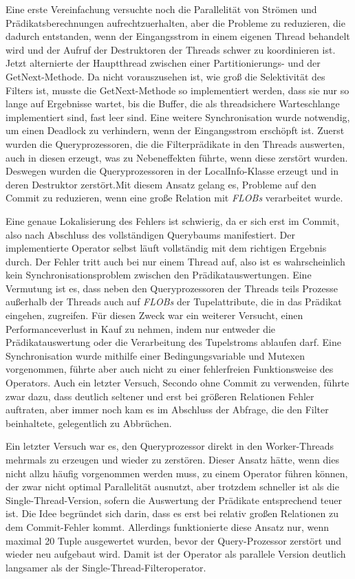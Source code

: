 \documentclass[a4paper,12pt,twoside]{article}
\newcommand{\Fb}[1]{\textit{#1}} %
\begin{document}
Eine erste Vereinfachung versuchte noch die Parallelität von Strömen und Prädikatsberechnungen aufrechtzuerhalten, aber die Probleme zu reduzieren, die dadurch entstanden, wenn der Eingangsstrom in einem eigenen Thread behandelt wird und der Aufruf der Destruktoren der Threads schwer zu koordinieren ist. Jetzt alternierte der Hauptthread zwischen einer Partitionierungs- und der GetNext-Methode. Da nicht vorauszusehen ist, wie groß die Selektivität des Filters ist, musste die GetNext-Methode so implementiert werden, dass sie nur so lange auf Ergebnisse wartet, bis die Buffer, die als threadsichere Warteschlange implementiert sind, fast leer sind. Eine weitere Synchronisation wurde notwendig, um einen Deadlock zu verhindern, wenn der Eingangsstrom erschöpft ist. Zuerst wurden die Queryprozessoren, die die Filterprädikate in den Threads auswerten, auch in diesen erzeugt, was zu Nebeneffekten führte, wenn diese zerstört wurden. Deswegen wurden die Queryprozessoren in der LocalInfo-Klasse erzeugt und in deren Destruktor zerstört.Mit diesem Ansatz gelang es, Probleme auf den Commit zu reduzieren, wenn eine große Relation mit \Fb{FLOBs} verarbeitet wurde.

Eine genaue Lokalisierung des Fehlers ist schwierig, da er sich erst im Commit, also nach Abschluss des vollständigen Querybaums manifestiert. Der implementierte Operator selbst läuft vollständig mit dem richtigen Ergebnis durch. Der Fehler tritt auch bei nur einem Thread auf, also ist es wahrscheinlich kein Synchronisationsproblem zwischen den Prädikatauswertungen. Eine Vermutung ist es, dass neben den Queryprozessoren der Threads teils Prozesse außerhalb der Threads auch auf \Fb{FLOBs} der Tupelattribute, die in das Prädikat eingehen, zugreifen. Für diesen Zweck war ein weiterer Versucht, einen Performanceverlust in Kauf zu nehmen, indem nur entweder die Prädikatauswertung oder die Verarbeitung des Tupelstroms ablaufen darf. Eine Synchronisation wurde mithilfe einer Bedingungsvariable und Mutexen vorgenommen, führte aber auch nicht zu einer fehlerfreien Funktionsweise des Operators. Auch ein letzter Versuch, Secondo ohne Commit zu verwenden, führte zwar dazu, dass deutlich seltener und erst bei größeren Relationen Fehler auftraten, aber immer noch kam es im Abschluss der Abfrage, die den Filter beinhaltete, gelegentlich zu Abbrüchen.

Ein letzter Versuch war es, den Queryprozessor direkt in den Worker-Threads mehrmals zu erzeugen und wieder zu zerstören. Dieser Ansatz hätte, wenn dies nicht allzu häufig vorgenommen werden muss, zu einem Operator führen können, der zwar nicht optimal Parallelität ausnutzt, aber trotzdem schneller ist als die Single-Thread-Version, sofern die Auswertung der Prädikate entsprechend teuer ist. Die Idee begründet sich darin, dass es erst bei relativ großen Relationen zu dem Commit-Fehler kommt. Allerdings funktionierte diese Ansatz nur, wenn maximal 20 Tuple ausgewertet wurden, bevor der Query-Prozessor zerstört und wieder neu aufgebaut wird. Damit ist der Operator als parallele Version deutlich langsamer als der Single-Thread-Filteroperator. 
\end{document}
